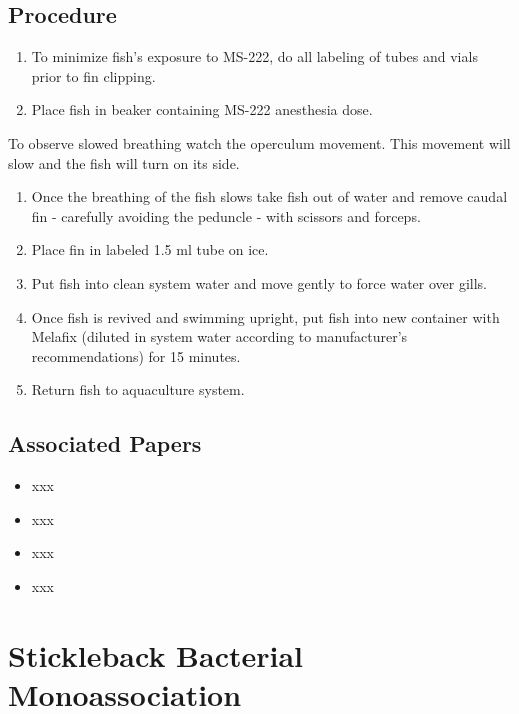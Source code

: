 \documentclass[
  letterpaper,
  DIV=11,
  numbers=noendperiod]{scrreprt}
\providecommand{\tightlist}{%
  \setlength{\itemsep}{0pt}\setlength{\parskip}{0pt}}\usepackage{longtable,booktabs,array}
\begin{document}
\hypertarget{procedure-75}{%
\section{Procedure}\label{procedure-75}}

\begin{enumerate}
\def\labelenumi{\arabic{enumi}.}
\tightlist
\item
  To minimize fish's exposure to MS-222, do all labeling of tubes and
  vials prior to fin clipping.
\item
  Place fish in beaker containing MS-222 anesthesia dose.
\end{enumerate}

To observe slowed breathing watch the operculum movement. This movement
will slow and the fish will turn on its side.

\begin{enumerate}
\def\labelenumi{\arabic{enumi}.}
\setcounter{enumi}{2}
\tightlist
\item
  Once the breathing of the fish slows take fish out of water and remove
  caudal fin - carefully avoiding the peduncle - with scissors and
  forceps.
\item
  Place fin in labeled 1.5 ml tube on ice.
\item
  Put fish into clean system water and move gently to force water over
  gills.
\item
  Once fish is revived and swimming upright, put fish into new container
  with Melafix (diluted in system water according to manufacturer's
  recommendations) for 15 minutes.
\item
  Return fish to aquaculture system.
\end{enumerate}

\hypertarget{associated-papers-52}{%
\section{Associated Papers}\label{associated-papers-52}}

\begin{itemize}
\tightlist
\item
  xxx
\item
  xxx
\item
  xxx
\item
  xxx
\end{itemize}

\hypertarget{sec-vert_exp-mono_ass_SB}{%
\chapter{Stickleback Bacterial
Monoassociation}\label{sec-vert_exp-mono_ass_SB}}
\end{document}
